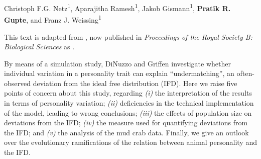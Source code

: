 
\pagestyle{plain}

\begingroup

\let\clearpage\relax
\let\cleardoublepage\relax
\let\cleardoublepage\relax

\begin{interludeenv}

\renewcommand\thefigure{\theinterludes-\arabic{figure}}
\setcounter{figure}{0}
\setcounter{footnote}{0}


\label{box:details}

	\noindent Christoph F.G. Netz\textsuperscript{1}, Aparajitha Ramesh\textsuperscript{1}, Jakob Gismann\textsuperscript{1}, \textbf{Pratik R. Gupte}, and Franz J. Weissing\textsuperscript{1}
	

	\medskip

	\noindent {\large{$\Delta$}} {This text is adapted from \citet{netz2022}, now published in \textit{Proceedings of the Royal Society B: Biological Sciences} as .
	}

	\medskip

	By means of a simulation study, DiNuzzo and Griffen  investigate whether individual variation in a personality trait can explain ``undermatching'', an often-observed deviation from the ideal free distribution (IFD). 
	Here we raise five points of concern about this study, regarding \emph{(i)} the interpretation of the results in terms of personality variation; \emph{(ii)} deficiencies in the technical implementation of the model, leading to wrong conclusions; \emph{(iii)} the effects of population size on deviations from the IFD; \emph{(iv)} the measure used for quantifying deviations from the IFD; and \emph{(v)} the analysis of the mud crab data. 
	Finally, we give an outlook over the evolutionary ramifications of the relation between animal personality and the IFD.
	

\end{interludeenv}
